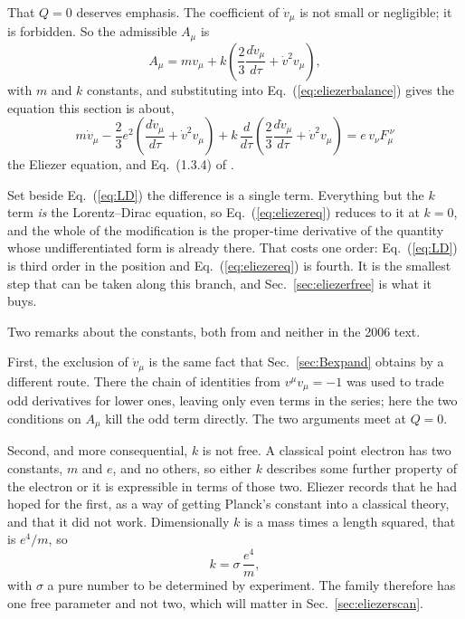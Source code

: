 \documentclass[preprint]{aastex701}
\begin{document}
That $Q=0$ deserves emphasis. The coefficient of $\dot v_\mu$ is not small or
negligible; it is forbidden. So the admissible $A_\mu$ is
\begin{equation}
A_\mu = m v_\mu + k\left(\frac{2}{3}\frac{d\dot v_\mu}{d\tau}
        + \dot v^2 v_\mu\right),
\label{eq:Amu}
\end{equation}
with $m$ and $k$ constants, and substituting into
Eq.~(\ref{eq:eliezerbalance}) gives the equation this section is about,
\begin{equation}
\boxed{\;m\dot v_\mu - \frac{2}{3}e^2\left(\frac{d\dot v_\mu}{d\tau}
  + \dot v^2v_\mu\right)
+ k\,\frac{d}{d\tau}\left(\frac{2}{3}\frac{d\dot v_\mu}{d\tau}
  + \dot v^2 v_\mu\right) = e\,v_\nu F_\mu^{\ \nu}\;}
\tag{E}
\label{eq:eliezereq}
\end{equation}
the Eliezer equation, and Eq.~(1.3.4) of \citet{zhang2006}.

Set beside Eq.~(\ref{eq:LD}) the difference is a single term. Everything but
the $k$ term \emph{is} the Lorentz--Dirac equation, so
Eq.~(\ref{eq:eliezereq}) reduces to it at $k=0$, and the whole of the
modification is the proper-time derivative of the quantity whose undifferentiated
form is already there. That costs one order: Eq.~(\ref{eq:LD}) is third order in
the position and Eq.~(\ref{eq:eliezereq}) is fourth. It is the smallest step
that can be taken along this branch, and Sec.~\ref{sec:eliezerfree} is what it
buys.

Two remarks about the constants, both from \citet{eliezer1947} and neither in
the 2006 text.

First, the exclusion of $\dot v_\mu$ is the same fact that
Sec.~\ref{sec:Bexpand} obtains by a different route. There the chain of
identities from $v^\mu v_\mu=-1$ was used to trade odd derivatives for lower
ones, leaving only even terms in the series; here the two conditions on $A_\mu$
kill the odd term directly. The two arguments meet at $Q=0$.

Second, and more consequential, $k$ is not free. A classical point electron has
two constants, $m$ and $e$, and no others, so either $k$ describes some further
property of the electron or it is expressible in terms of those two. Eliezer
records that he had hoped for the first, as a way of getting Planck's constant
into a classical theory, and that it did not work. Dimensionally $k$ is a mass
times a length squared, that is $e^4/m$, so
\begin{equation}
k = \sigma\,\frac{e^4}{m},
\label{eq:sigma}
\end{equation}
with $\sigma$ a pure number to be determined by experiment. The family therefore
has one free parameter and not two, which will matter in
Sec.~\ref{sec:eliezerscan}.
\end{document}

